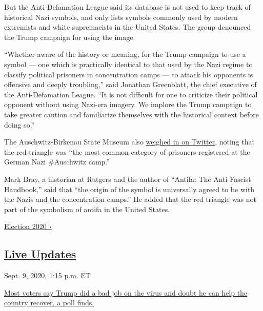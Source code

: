 But the Anti-Defamation League said its database is not used to keep
track of historical Nazi symbols, and only lists symbols commonly used
by modern extremists and white supremacists in the United States. The
group denounced the Trump campaign for using the image.

``Whether aware of the history or meaning, for the Trump campaign to use
a symbol --- one which is practically identical to that used by the Nazi
regime to classify political prisoners in concentration camps --- to
attack his opponents is offensive and deeply troubling,'' said Jonathan
Greenblatt, the chief executive of the Anti-Defamation League. ``It is
not difficult for one to criticize their political opponent without
using Nazi-era imagery. We implore the Trump campaign to take greater
caution and familiarize themselves with the historical context before
doing so.''

The Auschwitz-Birkenau State Museum also
\href{https://twitter.com/AuschwitzMuseum/status/1273668340729499650}{weighed
in on Twitter}, noting that the red triangle was ``the most common
category of prisoners registered at the German Nazi \#Auschwitz camp.''

Mark Bray, a historian at Rutgers and the author of ``Antifa: The
Anti-Fascist Handbook,'' said that ``the origin of the symbol is
universally agreed to be with the Nazis and the concentration camps.''
He added that the red triangle was not part of the symbolism of antifa
in the United States.

\href{https://www.nytimes3xbfgragh.onion/news-event/2020-election}{Election
2020 ›}

\hypertarget{live-updates}{%
\subsection{\texorpdfstring{\href{https://www.nytimes3xbfgragh.onion/live/2020/09/09/us/trump-vs-biden}{Live
Updates}}{Live Updates}}\label{live-updates}}

\href{https://www.nytimes3xbfgragh.onion/live/2020/09/09/us/trump-vs-biden\#most-voters-say-trump-did-a-bad-job-on-the-virus-and-doubt-he-can-help-the-country-recover-a-poll-finds}{}

Sept. 9, 2020, 1:15 p.m. ET

\href{https://www.nytimes3xbfgragh.onion/live/2020/09/09/us/trump-vs-biden\#most-voters-say-trump-did-a-bad-job-on-the-virus-and-doubt-he-can-help-the-country-recover-a-poll-finds}{Most
voters say Trump did a bad job on the virus and doubt he can help the
country recover, a poll
finds.}\href{https://www.nytimes3xbfgragh.onion/live/2020/09/09/us/trump-vs-biden\#the-nih-director-knocks-down-trumps-prediction-that-a-virus-vaccine-will-be-approved-by-election-day}{}

